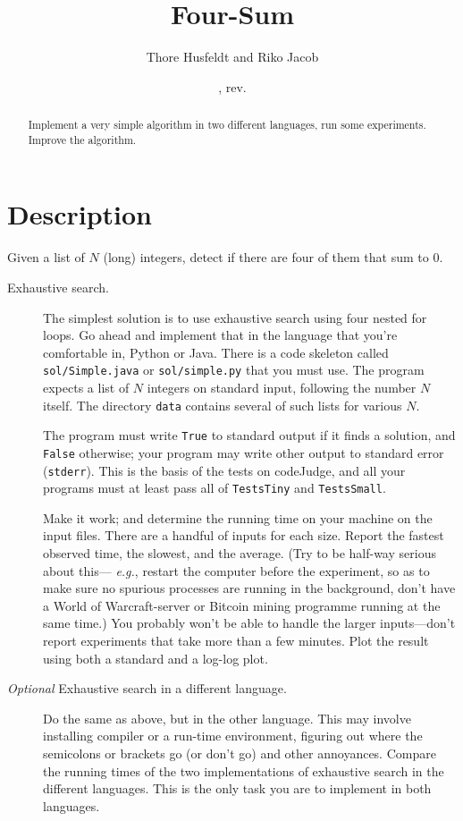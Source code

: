 \documentclass{tufte-handout}
\title{Four-Sum}
\author{Thore Husfeldt and Riko Jacob}
\date{\GITAuthorDate, rev. \GITAbrHash}
\begin{document}
\maketitle
\begin{abstract}
  Implement a very simple algorithm in two different languages, run some experiments.
  Improve the algorithm.
\end{abstract}


 \section{Description}

 Given a list of $N$ (long) integers, detect if there are four of them that sum to $0$.

\begin{description}
  \item[Exhaustive search.]
The simplest solution is to use exhaustive search using four nested for loops.
Go ahead and implement that in the language that you’re comfortable in, Python or Java.
There is a code skeleton called \texttt{sol/Simple.java} or \texttt{sol/simple.py} that you must use.
The program expects a list of $N$ integers on standard input, following the number $N$ itself.
The directory \texttt{data} contains several of such lists for various $N$.

The program must write \texttt{True} to standard output if it finds a solution, and \texttt{False} otherwise;
your program may write other output to standard error (\texttt{stderr}).
This is the basis of the tests on codeJudge, and all your programs must at least pass all of \texttt{TestsTiny} and \texttt{TestsSmall}.

Make it work; and determine the running time on your machine on the input files. 
There are a handful of inputs for each size.
Report the fastest observed time, the slowest, and the average.
(Try to be half-way serious about this--- \emph{e.g.}, restart the computer before the experiment, so as to make sure no spurious processes are running in the background, don’t have a World of Warcraft-server or Bitcoin mining programme running at the same time.)
You probably won’t be able to handle the larger inputs---don’t report experiments that take more than a few minutes.
Plot the result using both a standard and a log-log plot.

\item[\emph{Optional} Exhaustive search in a different language.]
  Do the same as above, but in the other language.
  This may involve installing compiler or a run-time environment, figuring out where the semicolons or brackets go (or don’t go) and other annoyances.
  Compare the running times of the two implementations of exhaustive search in the different languages.
  This is the only task you are to implement in both languages.


\end{description}
\end{document}
